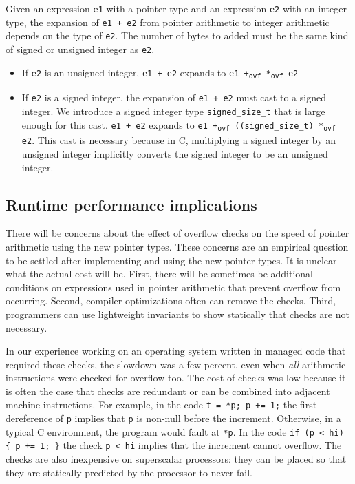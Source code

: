 Given an expression \texttt{e1} with a pointer type and an expression
\texttt{e2} with an integer type, the expansion of \texttt{e1 + e2} from
pointer arithmetic to integer arithmetic depends on the type of
\texttt{e2}. The number of bytes to added must be the same kind of
signed or unsigned integer as \texttt{e2}.

\begin{itemize}
\item
  If \texttt{e2} is an unsigned integer, \texttt{e1 + e2} expands to
  \texttt{e1 +\textsubscript{ovf}  *\textsubscript{ovf} e2}
\item
  If \texttt{e2} is a signed integer, the expansion of \texttt{e1 + e2}
  must cast  to a signed integer. We introduce a
  signed integer type \texttt{signed\_size\_t} that is large enough for
  this cast. \texttt{e1 + e2} expands to \texttt{e1 +\textsubscript{ovf}
  ((signed\_size\_t)  *\textsubscript{ovf} e2}. This cast is
  necessary because in C, multiplying a signed integer by an unsigned
  integer implicitly converts the signed integer to be an unsigned
  integer.
\end{itemize}

\subsection{Runtime performance implications}

There will be concerns about the effect of overflow checks on the speed
of pointer arithmetic using the new pointer types. These concerns are an
empirical question to be settled after implementing and using the new
pointer types. It is unclear what the actual cost will be. First, there
will be sometimes be additional conditions on expressions used in
pointer arithmetic that prevent overflow from occurring. Second,
compiler optimizations often can remove the checks. Third, programmers
can use lightweight invariants to show statically that checks are not
necessary.

In our experience working on an operating system written in managed code
that required these checks, the slowdown was a few percent, even when
\emph{all} arithmetic instructions were checked for overflow too. The
cost of checks was low because it is often the case that checks are
redundant or can be combined into adjacent machine instructions. For
example, in the code \texttt{t = *p; p += 1;} the first dereference of
\texttt{p} implies that \texttt{p} is non-null before the increment.
Otherwise, in a typical C environment, the program would fault at
\texttt{*p}. In the code \texttt{if (p \textless{} hi) \{ p += 1; \}}
the check \texttt{p \textless{} hi} implies that the increment cannot
overflow. The checks are also inexpensive on superscalar processors:
they can be placed so that they are statically predicted by the
processor to never fail.

